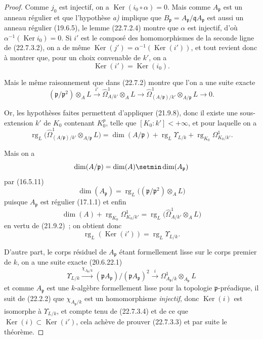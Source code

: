 \begin{proof}
Comme $j_0$ est injectif, on a $\operatorname{Ker}(i_0\circ\alpha)=0$. Mais comme
$A_{\mathfrak p}$ est un anneau régulier et que l'hypothèse \emph{a)} implique que
$B_{\mathfrak p}=A_{\mathfrak p}/\mathfrak qA_{\mathfrak p}$ est aussi un
anneau régulier (19.6.5), le lemme (22.7.2.4) montre que $\alpha$ est injectif,
d'où $\alpha^{-1}(\operatorname{Ker} i_0)=0$. Si $i'$ est le composé des homomorphismes de la
seconde ligne de (22.7.3.2), on a de même
$\operatorname{Ker}(j')=\alpha^{-1}(\operatorname{Ker}(i'))$, et tout revient donc à montrer que, pour un
choix convenable de $k'$, on a
\begin{equation}
\label{0.22.7.3.3-fr}
  \operatorname{Ker}(i')=\operatorname{Ker}(i_0).
  \tag{22.7.3.3}
\end{equation}

Mais le même raisonnement que dans (22.7.2) montre que l'on a une suite exacte
\[
  (\mathfrak p/\mathfrak p^2)\otimes_AL\xrightarrow{i'}
  \widehat\Omega^1_{A/k'}\otimes_AL\longrightarrow
  \widehat\Omega^1_{(A/\mathfrak p)/k'}\otimes_{A/\mathfrak p}L
  \longrightarrow0.
\]

Or, les hypothèses faites permettent d'appliquer (21.9.8), donc il existe une
sous-extension $k'$ de $K_0$ contenant $K_0^p$, telle que
$[K_0:k']<+\infty$, et pour laquelle on a
\[
  \operatorname{rg}_L\bigl(\widehat\Omega^1_{(A/\mathfrak p)/k'}
  \otimes_{A/\mathfrak p}L\bigr)
  =\dim(A/\mathfrak p)+\operatorname{rg}_L\Upsilon_{L/k}
  +\operatorname{rg}_{K_0}\Omega^1_{K_0/k'}.
\]

Mais on a
\[
  \dim(A/\mathfrak p)=\dim(A)\setmin\dim(A_{\mathfrak p})
\]
par (16.5.11)
\[
  \dim(A_{\mathfrak p})
  =\operatorname{rg}_L\bigl((\mathfrak p/\mathfrak p^2)\otimes_AL\bigr)
\]
puisque $A_{\mathfrak p}$ est régulier (17.1.1) et enfin
\[
  \dim(A)+\operatorname{rg}_{K_0}\Omega^1_{K_0/k'}
  =\operatorname{rg}_L\bigl(\widehat\Omega^1_{A/k'}\otimes_AL\bigr)
\]
en vertu de (21.9.2)~; on obtient donc
\begin{equation}
\label{0.22.7.3.4-fr}
  \operatorname{rg}_L(\operatorname{Ker}(i'))=\operatorname{rg}_L\Upsilon_{L/k}.
  \tag{22.7.3.4}
\end{equation}

D'autre part, le corps résiduel de $A_{\mathfrak p}$ étant formellement lisse
sur le corps premier de $k$, on a une suite exacte (20.6.22.1)
\[
  \Upsilon_{L/k}\xrightarrow{\chi_{A_{\mathfrak p}/k}}
  (\mathfrak pA_{\mathfrak p})/(\mathfrak pA_{\mathfrak p})^2
  \xrightarrow{i}\Omega^1_{A_{\mathfrak p}/k}
  \otimes_{A_{\mathfrak p}}L
\]
et comme $A_{\mathfrak p}$ est une $k$-algèbre formellement lisse pour la
topologie $\mathfrak p$-préadique, il suit de (22.2.2) que
$\chi_{A_{\mathfrak p}/k}$ est un homomorphisme \emph{injectif}, donc $\operatorname{Ker}(i)$ est
isomorphe à $\Upsilon_{L/k}$, et compte tenu de (22.7.3.4) et de ce que
$\operatorname{Ker}(i)\subset\operatorname{Ker}(i')$, cela achève de prouver (22.7.3.3) et par suite le
théorème.
\end{proof}

